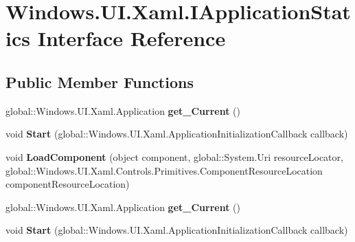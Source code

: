 \hypertarget{interface_windows_1_1_u_i_1_1_xaml_1_1_i_application_statics}{}\section{Windows.\+U\+I.\+Xaml.\+I\+Application\+Statics Interface Reference}
\label{interface_windows_1_1_u_i_1_1_xaml_1_1_i_application_statics}
\subsection*{Public Member Functions}
\begin{DoxyCompactItemize}
\item 
\mbox{\label{interface_windows_1_1_u_i_1_1_xaml_1_1_i_application_statics_a129c53c72c044776a1ea808234dc4e0a}} 
global\+::\+Windows.\+U\+I.\+Xaml.\+Application {\bfseries get\+\_\+\+Current} ()
\item 
\mbox{\label{interface_windows_1_1_u_i_1_1_xaml_1_1_i_application_statics_ac5636b6eb0ad2b58bdaae989c1e1ae9b}} 
void {\bfseries Start} (global\+::\+Windows.\+U\+I.\+Xaml.\+Application\+Initialization\+Callback callback)
\item 
\mbox{\label{interface_windows_1_1_u_i_1_1_xaml_1_1_i_application_statics_a634ebea47355c64e3699518f99f25457}} 
void {\bfseries Load\+Component} (object component, global\+::\+System.\+Uri resource\+Locator, global\+::\+Windows.\+U\+I.\+Xaml.\+Controls.\+Primitives.\+Component\+Resource\+Location component\+Resource\+Location)
\item 
\mbox{\label{interface_windows_1_1_u_i_1_1_xaml_1_1_i_application_statics_a129c53c72c044776a1ea808234dc4e0a}} 
global\+::\+Windows.\+U\+I.\+Xaml.\+Application {\bfseries get\+\_\+\+Current} ()
\item 
\mbox{\label{interface_windows_1_1_u_i_1_1_xaml_1_1_i_application_statics_ac5636b6eb0ad2b58bdaae989c1e1ae9b}} 
void {\bfseries Start} (global\+::\+Windows.\+U\+I.\+Xaml.\+Application\+Initialization\+Callback callback)

\end{DoxyCompactItemize}
